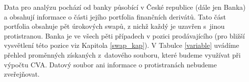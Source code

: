 \documentclass[a4paper,12pt]{report}
\theoremstyle{definition} \newtheorem{definice}[veta]{Definice}
\theoremstyle{remark}
\begin{document}
Data pro analýzu pochází od banky působící v České republice (dále jen Banka) a obsahují informace o části jejího portfolia finančních derivátů.
Tato část portfolia obsahuje pět úrokových swapů, z nichž každý je uzavřen s~jinou protistranou.
Banka je ve všech pěti případech v pozici prodávajícího (pro bližší vysvětlení této pozice viz Kapitola \ref{swap_kap}).
V Tabulce \ref{variable} uvádíme přehled proměnných získaných z~datového souboru, které budeme využívat při výpočtu CVA.
Datový soubor ani informace o protistranách nebudeme zveřejňovat.


\begin{table}[!htbp]
\centering
\caption{Proměnné v datovém souboru}  \label{variable}
\vspace{5mm}
\end{table}
\end{document}
